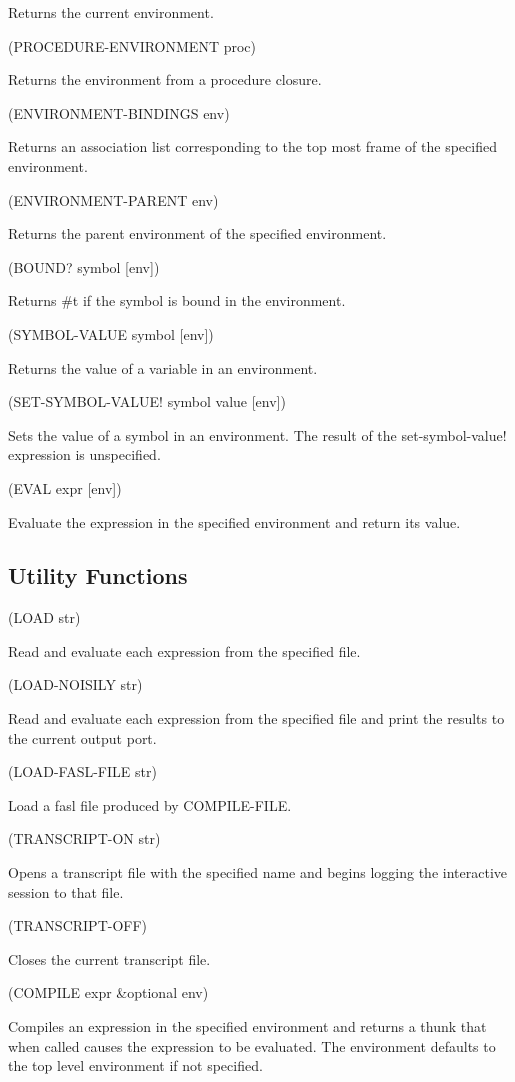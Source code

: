 \documentclass[11pt]{article}
\begin{document}
Returns the current environment.

(PROCEDURE-ENVIRONMENT proc)

Returns the environment from a procedure closure.

(ENVIRONMENT-BINDINGS env)

Returns an association list corresponding to the top most frame of the
specified environment.

(ENVIRONMENT-PARENT env)

Returns the parent environment of the specified environment.

(BOUND? symbol [env])

Returns \#t if the symbol is bound in the environment.

(SYMBOL-VALUE symbol [env])

Returns the value of a variable in an environment.

(SET-SYMBOL-VALUE! symbol value [env])

Sets the value of a symbol in an environment.  The result of the
set-symbol-value! expression is unspecified.

(EVAL expr [env])

Evaluate the expression in the specified environment and return its value.
\subsection{Utility Functions}
\label{sec-1-43}

(LOAD str)

Read and evaluate each expression from the specified file.

(LOAD-NOISILY str)

Read and evaluate each expression from the specified file and print the
results to the current output port.

(LOAD-FASL-FILE str)

Load a fasl file produced by COMPILE-FILE.

(TRANSCRIPT-ON str)

Opens a transcript file with the specified name and begins logging the
interactive session to that file.

(TRANSCRIPT-OFF)

Closes the current transcript file.

(COMPILE expr \&optional env)

Compiles an expression in the specified environment and returns a thunk
that when called causes the expression to be evaluated.  The environment
defaults to the top level environment if not specified.
\end{document}
